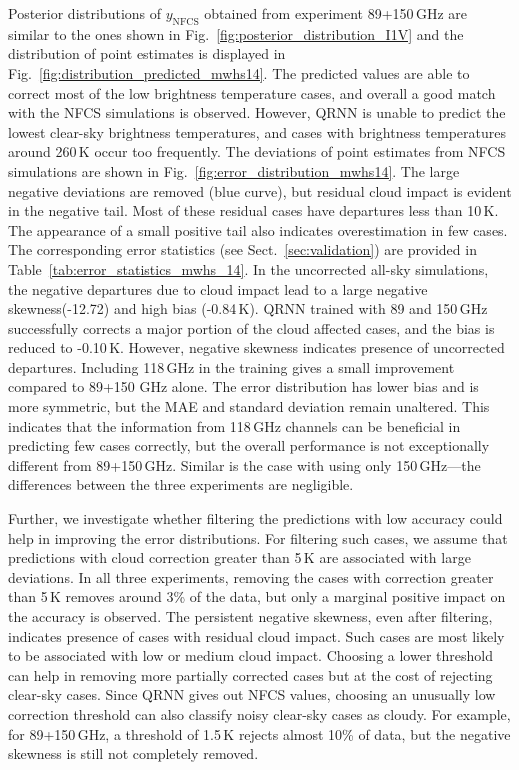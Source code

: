 \documentclass[amt, manuscript]{copernicus}
\newcommand{\ynfcs}{y_\text{NFCS}}
\begin{document}
Posterior distributions of $\ynfcs$ obtained from experiment 89+150\,GHz are similar to the ones shown in Fig.~\ref{fig:posterior_distribution_I1V} and the distribution of point estimates is displayed in Fig.~\ref{fig:distribution_predicted_mwhs14}. The predicted values are able to correct most of the low brightness temperature cases, and overall a good match with the NFCS simulations is observed. However, QRNN is unable to predict the lowest clear-sky brightness temperatures, and cases with brightness temperatures around 260\,K occur too frequently. The deviations of point estimates from NFCS simulations are shown in Fig.~\ref{fig:error_distribution_mwhs14}. The large negative deviations are removed (blue curve), but residual cloud impact is evident in the negative tail. Most of these residual cases have departures less than 10\,K. The appearance of a small positive tail also indicates overestimation in few cases. The corresponding error statistics (see Sect.~\ref{sec:validation}) are provided in  Table~\ref{tab:error_statistics_mwhs_14}. In the uncorrected all-sky simulations, the negative departures due to cloud impact lead to a large negative skewness(-12.72) and high bias (-0.84\,K). QRNN trained with 89 and 150\,GHz successfully corrects a major portion of the cloud affected cases, and the bias is reduced to -0.10\,K. However, negative skewness indicates presence of  uncorrected departures. Including 118\,GHz in the training gives a small improvement compared to 89+150 GHz alone. The error distribution has lower bias and is more symmetric, but the MAE and standard deviation remain unaltered. This indicates that the information from 118\,GHz channels can be beneficial in predicting few cases correctly, but the overall performance is not exceptionally different from 89+150\,GHz. Similar is the case with using only 150\,GHz---the differences between the three experiments are negligible.

Further, we investigate whether filtering the predictions with low accuracy could help in improving the error distributions. For filtering such cases, we assume that predictions with cloud correction greater than 5\,K are associated with large deviations. In all three experiments, removing the cases with correction greater than 5\,K removes around 3\% of the data, but only a marginal positive impact on the accuracy is observed. The persistent negative skewness, even after filtering, indicates presence of cases with residual cloud impact. Such cases are most likely to be associated with low or medium cloud impact. Choosing a lower threshold can help in removing more partially corrected cases but at the cost of rejecting clear-sky cases. Since QRNN gives out NFCS values, choosing an unusually low correction threshold can also classify noisy clear-sky cases as cloudy. For example, for 89+150\,GHz, a threshold of 1.5\,K rejects almost 10\% of data, but the negative skewness is still not completely removed.  
\end{document}
